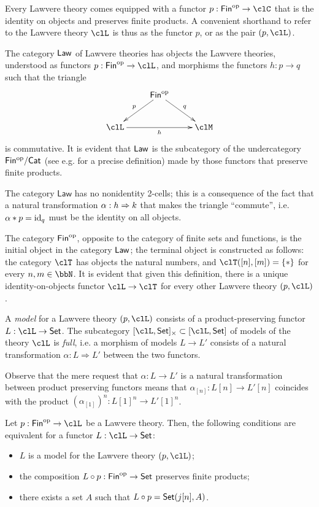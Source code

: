 Every Lawvere theory comes equipped with a functor $p : \cate{Fin}^\op \to \clC$ that is the identity on objects and preserves finite products. A convenient shorthand to refer to the Lawvere theory $\clL$ is thus as the functor $p$, or as the pair $(p,\clL)$.
\begin{definition}
	The category $\mathsf{Law}$ of Lawvere theories has objects the Lawvere theories, understood as functors $p : \cate{Fin}^\op \to \clL$, and morphisms the functors $h :  p\to q$ such that the triangle
	\[\xymatrix{
			& \cate{Fin}^\op \ar[dr]^q \ar[dl]_p & \\
			\clL \ar[rr]_h && \clM
		}\]
	is commutative. It is evident that $\mathsf{Law}$ is the subcategory of the undercategory $\mathsf{Fin^{\text{op}}}/\mathsf{Cat}$ (see e.g. \cite[I.6]{McL}for a precise definition) made by those functors that preserve finite products.
\end{definition}
\begin{remark}
	The category $\textsf{Law}$ has no nonidentity 2-cells; this is a consequence of the fact that a natural transformation $\alpha : h \Rightarrow k$ that makes the triangle ``commute'', i.e. $\alpha * p = \text{id}_q$ must be the identity on all objects.
\end{remark}
\begin{example}
	The category $\mathsf{Fin}^{\text{op}}$, opposite to the category of finite sets and functions, is the initial object in the category  $\mathsf{Law}$; the terminal object is constructed as follows: the category $\clT$ has objects the natural numbers, and $\clT([n],[m])=\{*\}$ for every $n,m\in \bbN$. It is evident that given this definition, there is a unique identity-on-objects functor $\clL \to \clT$ for every other Lawvere theory $(p,\clL)$.
\end{example}
\begin{definition}
	A \emph{model} for a Lawvere theory $(p ,\clL)$ consists of a product-preserving functor $L : \clL \to \Set$. The subcategory $[\clL,\Set]_\times \subset [\clL, \Set]$ of models of the theory $\clL$ is \emph{full}, i.e. a morphism of models $L \to L'$ consists of a natural transformation $\alpha : L \Rightarrow L'$ between the two functors.
\end{definition}
Observe that the mere request that $\alpha : L \to L'$ is a natural transformation between product preserving functors means that $\alpha_{[n]} : L[n] \to L'[n]$ coincides with the product $(\alpha_{[1]})^n : L[1]^n \to L'[1]^n$.
\begin{proposition}
	Let $p : \cate{Fin}^\op\to \clL$ be a Lawvere theory. Then, the following conditions are equivalent for a functor $L : \clL \to \Set$:
	\begin{itemize}
		\item $L$ is a model for the Lawvere theory $(p,\clL)$;
		\item the composition $L\circ p : \mathsf{Fin}^{\text{op}} \to \mathsf{Set}$ preserves finite products;
		\item there exists a set $A$ such that $L\circ p = \mathsf{Set}(j[n],A)$.
	\end{itemize}
\end{proposition}
